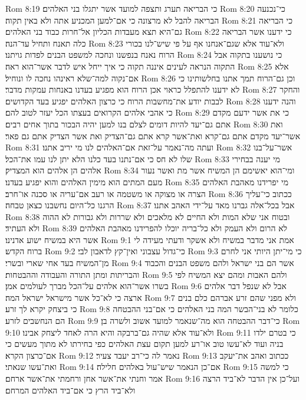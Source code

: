 Rom 8:19  כי הבריאה תערג ותצפה למועד אשר יתגלו בני האלהים׃
Rom 8:20  כי־נכנעה הבריאה להבל לא מרצונה כי אם־למען המכניע אתה ולא באין תקוה׃
Rom 8:21  כי הבריאה גם־היא תצא מעבדות הכליון אל־חרות כבוד בני האלהים׃
Rom 8:22  כי ידענו אשר הבריאה כלה תאנח ותחיל עד־הנה׃
Rom 8:23  ולא־עוד אלא שגם־אנחנו אף על פי שיש־לנו בכורי הרוח נאנח בנפשנו ונחכה למשפט הבנים לפדות גויתנו׃
Rom 8:24  כי נושענו בתקוה אבל התקוה הנראה לעינים איננה תקוה כי איך ייחל איש לדבר אשר־הוא ראה׃
Rom 8:25  אלא אם־נקוה למה־שלא ראינהו נחכה לו ונוחיל׃
Rom 8:26  וכן גם־הרוח תמך אתנו בחלשותינו כי לא ידענו להתפלל כראוי אכן הרוח הוא מפגיע בעדנו באנחות עמקות מדבר׃
Rom 8:27  והחקר לבבות יודע את־מחשבות הרוח כי כרצון האלהים יפגיע בעד הקדושים׃
Rom 8:28  והנה ידענו כי אהבי אלהים הקרואים בעצתו הכל יעזר לטוב להם׃
Rom 8:29  כי את אשר ידעם מקדם אתם גם־יעד להיות דומים לצלם בנו למען יהיה הבכור בתוך אחים רבים׃
Rom 8:30  ואת אשר־יעד מקדם אתם גם־קרא ואת־אשר קרא אתם גם־הצדיק ואת אשר הצדיק אתם גם פאר׃
Rom 8:31  ועתה מה־נאמר על־זאת אם־האלהים לנו מי יריב אתנו׃
Rom 8:32  אשר־על־בנו שלו לא חס כי אם־נתנו בעד כלנו הלא יתן לנו עמו את־הכל׃
Rom 8:33  מי יענה בבחירי אלהים הן אלהים הוא המצדיק׃
Rom 8:34  ומי־הוא יאשימם הן המשיח אשר מת ואשר נעור מעם המתים הוא מימין האלהים והוא יפגיע בעדנו׃
Rom 8:35  מי יפרידנו מאהבת האלהים הצרה או מצוקה או משטמה או רעב אם־עריה או סכנה או־חרב׃
Rom 8:36  ככתוב כי־עליך הרגנו כל־היום נחשבנו כצאן טבחה׃
Rom 8:37  אבל בכל־אלה גברנו מאד על־ידי האהב אתנו׃
Rom 8:38  ובטוח אני שלא המות ולא החיים לא מלאכים ולא שררות ולא גבורות לא ההוה ולא העתיד׃
Rom 8:39  לא הרום ולא העמק ולא כל־בריה יוכלו להפרידנו מאהבת האלהים אשר היא במשיח ישוע אדנינו׃
Rom 9:1  אמת אני מדבר במשיח ולא אשקר ודעתי מעידה לי ברוח הקדש׃
Rom 9:2  כי־גדול עצבוני ואין־קץ לדאבון לבי׃
Rom 9:3  כי מי־יתן היותי אני לחרם מן־המשיח בעד אחי שארי ובשרי׃
Rom 9:4  אשר הם בני ישראל ולהם משפט הבנים והכבוד והבריתות ומתן התורה והעבודה וההבטחות׃
Rom 9:5  ולהם האבות ומהם יצא המשיח לפי בשרו אשר־הוא אלהים על־הכל מברך לעולמים אמן׃
Rom 9:6  אבל לא שנפל דבר אלהים ארצה כי לא־כל אשר מישראל ישראל המה׃
Rom 9:7  ולא מפני שהם זרע אברהם כלם בנים כי ביצחק יקרא לך זרע׃
Rom 9:8  כלומר לא בני־הבשר המה בני האלהים כי אם־בני ההבטחה הם הנחשבים לזרע׃
Rom 9:9  כי־דבר ההבטחה הוא מה־שנאמר למועד אשוב ולשרה בן׃
Rom 9:10  ולא־עוד אלא שהיה גם־ברבקה והיא הרה לאחד ליצחק אבינו׃
Rom 9:11  כי בטרם ילדו בניה ועוד לא־עשו טוב או־רע למען תקום עצת האלהים כפי בחירתו לא מתוך מעשים כי אם־כרצון הקרא׃
Rom 9:12  נאמר לה כי־רב יעבד צעיר׃
Rom 9:13  ככתוב ואהב את־יעקב ואת־עשו שנאתי׃
Rom 9:14  אם־כן הנאמר שיש־עול באלהים חלילה׃
Rom 9:15  כי למשה אמר וחנתי את־אשר אחן ורחמתי את־אשר ארחם׃
Rom 9:16  ועל־כן אין הדבר לא־ביד הרצה ולא־ביד הרץ כי אם־ביד האלהים המרחם׃
